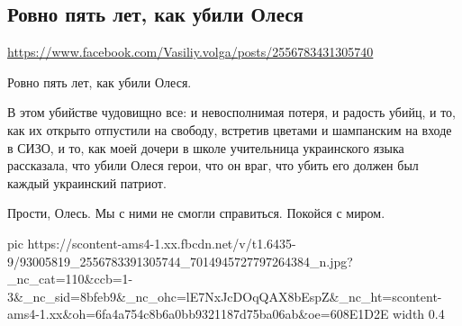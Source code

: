  
 
 
 
 

\subsection{Ровно пять лет, как убили Олеся}
\label{sec:apr_2020.fb.volga_vasilij.1.buzina_oles}
\url{https://www.facebook.com/Vasiliy.volga/posts/2556783431305740}

Ровно пять лет, как убили Олеся. 

В этом убийстве чудовищно все: и невосполнимая потеря, и радость убийц, и то,
как их открыто отпустили на свободу, встретив цветами и шампанским на входе в
СИЗО, и то, как моей дочери в школе учительница украинского языка рассказала,
что убили Олеся герои, что он враг, что убить его должен был каждый украинский
патриот.

Прости, Олесь. Мы с ними не смогли справиться. Покойся с миром.


\ifcmt
  pic https://scontent-ams4-1.xx.fbcdn.net/v/t1.6435-9/93005819_2556783391305744_7014945727797264384_n.jpg?_nc_cat=110&ccb=1-3&_nc_sid=8bfeb9&_nc_ohc=lE7NxJcDOqQAX8bEspZ&_nc_ht=scontent-ams4-1.xx&oh=6fa4a754c8b6a0bb9321187d75ba06ab&oe=608E1D2E
  width 0.4
\fi

